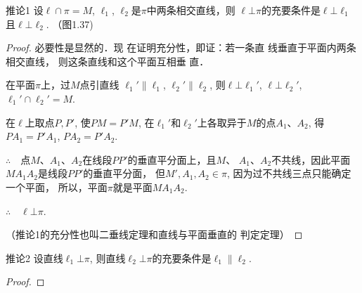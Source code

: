 \begin{blk}
{推论1} 设$\ell\cap \pi=M$, $\ell_1$, $\ell_2$是$\pi$中两条相交直线，则
$\ell\bot \pi$的充要条件是$\ell\bot \ell_1$且$\ell\bot \ell_2$.
（图1.37)
\end{blk}

\begin{proof}
必要性是显然的．现
在证明充分性，即证：若一条直
线垂直于平面内两条相交直线，
则这条直线和这个平面互相垂
直．

在平面$\pi$上，过$M$点引直线
$\ell_1'\parallel \ell_1$, $\ell_2'\parallel \ell_2$, 则$\ell\bot\ell_1'$, $\ell\bot\ell_2'$, 
$\ell_1'\cap \ell_2'=M$.

在$\ell$上取点$P,P'$, 使$PM=P'M$,
在$\ell_1'$和$\ell_2'$上各取异于$M$的点$A_1$、$A_2$, 得$PA_1=P'A_1$, $PA_2=P'A_2$.

$\therefore\quad $点$M$、$A_1$、$A_2$在线段$PP'$的垂直平分面上，且$M$、
$A_1$、$A_2$不共线，因此平面$MA_1A_2$是线段$PP'$的垂直平分面，
但$M',A_1,A_2\in \pi$, 因为过不共线三点只能确定一个平面，
所以，平面$\pi$就是平面$MA_1A_2$.

$\therefore\quad \ell\bot \pi$.

（推论1的充分性也叫二垂线定理和直线与平面垂直的
判定定理）
\end{proof}


\begin{blk}
  {推论2} 设直线$\ell_1\bot \pi$, 则直线$\ell_2\bot \pi$的充要条件是$\ell_1\parallel\ell_2$.
\end{blk}

\begin{proof}
  





\end{proof}




\begin{example}
  
\end{example}

\begin{solution}
  
\end{solution}
\begin{example}
  
\end{example}

\begin{solution}
  
\end{solution}

